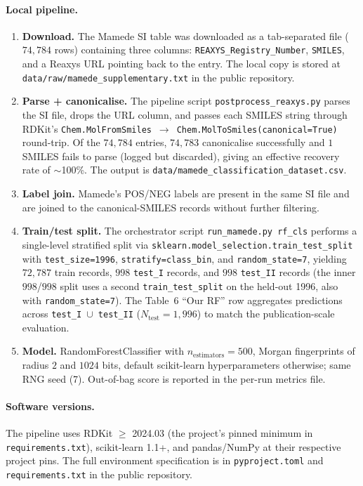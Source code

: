 \documentclass[journal=jcisd8,manuscript=suppinfo]{achemso}
\begin{document}
\paragraph{Local pipeline.}
\begin{enumerate}[leftmargin=2em,itemsep=2pt]
 \item \textbf{Download.} The Mamede SI table was downloaded as a tab-separated file ($74{,}784$ rows) containing three columns: \texttt{REAXYS\_Registry\_Number}, \texttt{SMILES}, and a Reaxys URL pointing back to the entry. The local copy is stored at \texttt{data/raw/mamede\_supplementary.txt} in the public repository.
 \item \textbf{Parse + canonicalise.} The pipeline script \texttt{postprocess\_reaxys.py} parses the SI file, drops the URL column, and passes each SMILES string through RDKit's \texttt{Chem.MolFromSmiles}\, $\rightarrow$\, \texttt{Chem.MolToSmiles(canonical=True)} round-trip. Of the $74{,}784$ entries, $74{,}783$ canonicalise successfully and $1$ SMILES fails to parse (logged but discarded), giving an effective recovery rate of $\sim$100\%. The output is \texttt{data/mamede\_classification\_dataset.csv}.
 \item \textbf{Label join.} Mamede's POS/NEG labels are present in the same SI file and are joined to the canonical-SMILES records without further filtering.
 \item \textbf{Train/test split.} The orchestrator script \texttt{run\_mamede.py rf\_cls} performs a single-level stratified split via \texttt{sklearn.model\_selection.train\_test\_split} with \texttt{test\_size=1996}, \texttt{stratify=class\_bin}, and \texttt{random\_state=7}, yielding $72{,}787$ train records, $998$ \texttt{test\_I} records, and $998$ \texttt{test\_II} records (the inner $998$/$998$ split uses a second \texttt{train\_test\_split} on the held-out 1996, also with \texttt{random\_state=7}). The Table~6 ``Our RF'' row aggregates predictions across \texttt{test\_I $\cup$ test\_II} ($N_{\text{test}} = 1{,}996$) to match the publication-scale evaluation.
 \item \textbf{Model.} RandomForestClassifier with $n_{\text{estimators}} = 500$, Morgan fingerprints of radius $2$ and $1024$ bits, default scikit-learn hyperparameters otherwise; same RNG seed (7). Out-of-bag score is reported in the per-run metrics file.
\end{enumerate}

\paragraph{Software versions.}
The pipeline uses RDKit $\geq$ 2024.03 (the project's pinned minimum in \texttt{requirements.txt}), scikit-learn 1.1+, and pandas/NumPy at their respective project pins. The full environment specification is in \texttt{pyproject.toml} and \texttt{requirements.txt} in the public repository.
\end{document}
